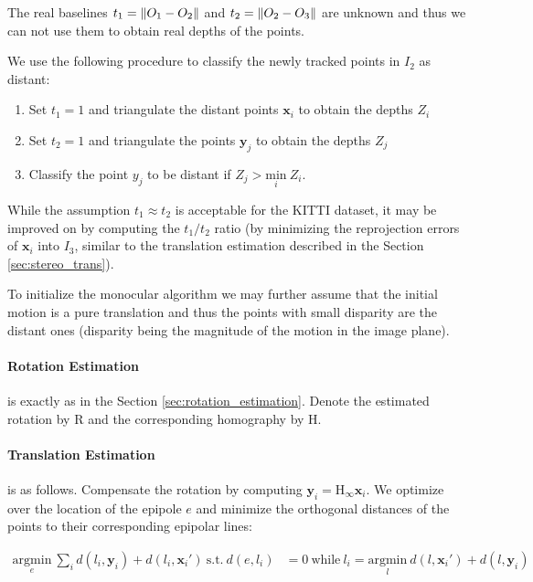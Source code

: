 \documentclass{bmvc2k}
\DeclarePairedDelimiter{\norm}{\lVert}{\rVert}
\begin{document}
The real baselines $t_1=\norm{O_1-O_2}$ and $t_2=\norm{O_2-O_3}$ are
unknown and thus we can not use them to obtain real depths of the
points.

We use the following procedure to classify the newly tracked points in
$I_2$ as distant:
\begin{enumerate}
\item Set $t_1=1$ and triangulate the distant points $\mathbf{x}_i$ to
  obtain the depths $Z_i$
\item Set $t_2=1$ and triangulate the points $\mathbf{y}_j$ to obtain
  the depths $Z_j$
\item Classify the point $y_j$ to be distant if
  $Z_j>\underset{i}{\text{min}}\ Z_i$.
\end{enumerate}

While the assumption $t_1 \approx t_2$ is acceptable for the KITTI
dataset, it may be improved on by computing the $t_1/t_2$ ratio (by
minimizing the reprojection errors of $\mathbf{x}_i$ into $I_3$,
similar to the translation estimation described in the Section
\ref{sec:stereo_trans}).

To initialize the monocular algorithm we may further assume that the
initial motion is a pure translation and thus the points with small
disparity are the distant ones (disparity being the magnitude of the
motion in the image plane).

\paragraph{Rotation Estimation} is exactly as in the Section 
\ref{sec:rotation_estimation}. Denote the estimated rotation by
$\mathrm{R}$ and the corresponding homography by $\mathrm{H}$.

\paragraph{Translation Estimation} is as follows. Compensate the
rotation by computing $\mathbf{y}_i = \mathrm{H_\infty}\mathbf{x}_i$.  We optimize over the location of
the epipole $e$ and minimize the orthogonal distances of the points to
their corresponding epipolar lines:

\begin{align}
  \underset{e}{\text{argmin}}\ \sum_i{d(l_i,\mathbf{y}_i)+d(l_i,\mathbf{x}_i')}\ \text{s.t.}\  d(e,l_i) & =0\ \text{while}\ l_i = \underset{l}{\text{argmin}}\ d(l,\mathbf{x}_i') + d(l,\mathbf{y}_i)
\end{align}
\end{document}
